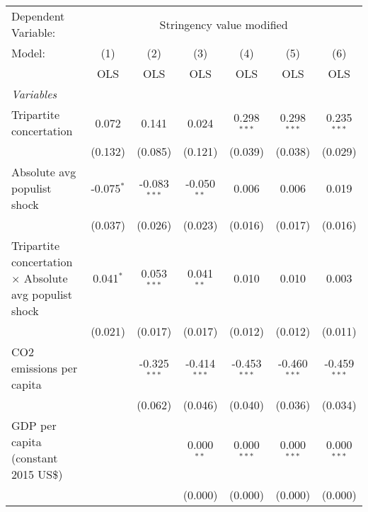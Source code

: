 
\begingroup
\centering
\begin{tabular}{lcccccc}
   \toprule
   Dependent Variable: & \multicolumn{6}{c}{Stringency value modified}\\
   Model:                                                        & (1)          & (2)            & (3)            & (4)            & (5)            & (6)\\  
                                                                 &  OLS         & OLS            & OLS            & OLS            & OLS            & OLS\\  
   \midrule
   \emph{Variables}\\
   Tripartite concertation                                       & 0.072        & 0.141          & 0.024          & 0.298$^{***}$  & 0.298$^{***}$  & 0.235$^{***}$\\   
                                                                 & (0.132)      & (0.085)        & (0.121)        & (0.039)        & (0.038)        & (0.029)\\   
   Absolute avg populist shock                                   & -0.075$^{*}$ & -0.083$^{***}$ & -0.050$^{**}$  & 0.006          & 0.006          & 0.019\\   
                                                                 & (0.037)      & (0.026)        & (0.023)        & (0.016)        & (0.017)        & (0.016)\\   
   Tripartite concertation $\times$ Absolute avg populist shock  & 0.041$^{*}$  & 0.053$^{***}$  & 0.041$^{**}$   & 0.010          & 0.010          & 0.003\\   
                                                                 & (0.021)      & (0.017)        & (0.017)        & (0.012)        & (0.012)        & (0.011)\\   
   CO2 emissions per capita                                      &              & -0.325$^{***}$ & -0.414$^{***}$ & -0.453$^{***}$ & -0.460$^{***}$ & -0.459$^{***}$\\   
                                                                 &              & (0.062)        & (0.046)        & (0.040)        & (0.036)        & (0.034)\\   
   GDP per capita (constant 2015 US\$)                           &              &                & 0.000$^{**}$   & 0.000$^{***}$  & 0.000$^{***}$  & 0.000$^{***}$\\   
                                                                 &              &                & (0.000)        & (0.000)        & (0.000)        & (0.000)\\   

\end{tabular}

